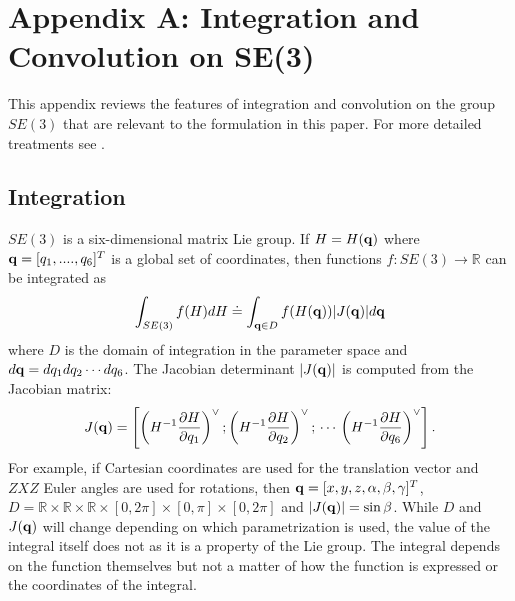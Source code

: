 \documentclass[twocolumn,10pt]{asme2ej}
\begin{document}
%
\appendix       %
\section*{Appendix A: Integration and Convolution on SE(3)}

This appendix reviews the features of integration and convolution on the group $SE(3)$ that are
relevant to the formulation in this paper. For more detailed treatments see \cite{myoldbook, vol2}.

\subsection*{Integration}

$SE(3)$ is a six-dimensional matrix Lie group. If $H = H({\bf q})$ where ${\bf q} = [q_1,....,q_6]^T$ is a global set of coordinates, then
functions $f:SE(3) \rightarrow \mathbb{R}$ can be integrated as
$$ \int_{SE(3)} f(H) dH \doteq \int_{{\bf q} \in D} f(H({\bf q})) |J({\bf q})| d{\bf q} $$
where $D$ is the domain of integration in the parameter space and $d{\bf q} = dq_1 dq_2 \cdots dq_6$. 
The Jacobian determinant $|J({\bf q})|$ is computed from the Jacobian matrix:
$$ J({\bf q}) = \left[\left(H^{-1} \frac{\partial H}{\partial q_1}\right)^{\vee}; \left(H^{-1} \frac{\partial H}{\partial q_2}\right)^{\vee};\,\cdots\,
\left(H^{-1} \frac{\partial H}{\partial q_6}\right)^{\vee}\right]. $$
For example, if Cartesian coordinates are used for the translation vector and $ZXZ$ Euler angles are used
for rotations, then ${\bf q} = [x,y,z,\alpha,\beta,\gamma]^T$, $D=\mathbb{R}\times\mathbb{R}\times\mathbb{R}\times[0,2\pi]\times[0,\pi]\times[0,2\pi]$ and $|J({\bf q})| = \sin \beta$. While $D$ and $J({\bf q})$ will change depending on which parametrization is used, the value of the integral itself does not as it is a property of the Lie group. The integral depends on the function themselves but not a matter of how the function is expressed or the coordinates of the integral.
\end{document}
